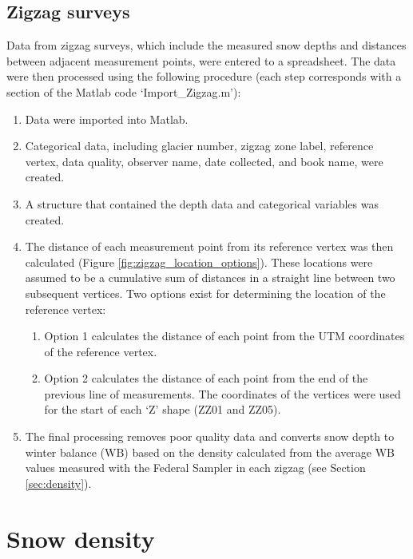 \documentclass{sfuthesis}
\begin{document}
\begin{appendices}
\subsection{Zigzag surveys}

Data from zigzag surveys, which include the measured snow depths and distances between adjacent measurement points, were entered to a spreadsheet. The data were then processed using the following procedure (each step corresponds with a section of the Matlab code `Import\_Zigzag.m'):
\begin{enumerate}
\item Data were imported into Matlab.
\item Categorical data, including glacier number, zigzag zone label, reference vertex, data quality, observer name, date collected, and book name, were created.
\item A structure that contained the depth data and categorical variables was created.
\item The distance of each measurement point from its reference vertex was then calculated (Figure \ref{fig:zigzag_location_options}). These locations were assumed to be a cumulative sum of distances in a straight line between two subsequent vertices. Two options exist for determining the location of the reference vertex:
 	\begin{enumerate}
	\item Option 1 calculates the distance of each point from the UTM coordinates of the reference vertex.
	\item Option 2 calculates the distance of each point from the end of the previous line of measurements. The coordinates of the vertices were used for the start of each `Z' shape (ZZ01 and ZZ05).
	\end{enumerate}
\item The final processing removes poor quality data and converts snow depth to winter balance (WB) based on the density calculated from the average WB values measured with the Federal Sampler in each zigzag (see Section \ref{sec:density}).
\end{enumerate}

\section{Snow density}


\end{appendices}
\end{document}
